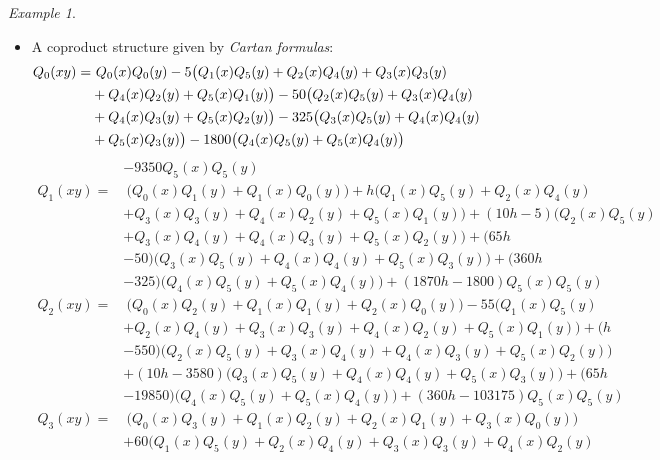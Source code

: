 \documentclass{gtpart}
\theoremstyle{definition}
\theoremstyle{remark}
\newtheorem{ex}[equation]{Example}
\renewcommand{\=}{\approx}
\renewcommand{\-}{\sim}
\numberwithin{equation}{section}
\begin{document}
\begin{ex}
\begin{itemize}
  \item A coproduct structure given by {\em Cartan formulas}: 
  \begin{equation*}
   \begin{split}
    Q_0(x y) = & ~ Q_0(x) Q_0(y) - 5 \big( Q_1(x) Q_5(y) + Q_2(x) Q_4(y) + Q_3(x) Q_3(y) \hskip 1.9cm \\
               & + Q_4(x) Q_2(y) + Q_5(x) Q_1(y) \big) - 50 \big( Q_2(x) Q_5(y) + Q_3(x) Q_4(y) \\
               & + Q_4(x) Q_3(y) + Q_5(x) Q_2(y) \big) - 325 \big( Q_3(x) Q_5(y) + Q_4(x) Q_4(y) \\
               & + Q_5(x) Q_3(y) \big) - 1800 \big( Q_4(x) Q_5(y) + Q_5(x) Q_4(y) \big) 
   \end{split}
  \end{equation*}
  \begin{equation*}
   \begin{split}
               & - 9350 Q_5(x) Q_5(y) \\
    Q_1(x y) = & ~ \big( Q_0(x) Q_1(y) + Q_1(x) Q_0(y) \big) + h \big( Q_1(x) Q_5(y) + Q_2(x) Q_4(y) \\
               & + Q_3(x) Q_3(y) + Q_4(x) Q_2(y) + Q_5(x) Q_1(y) \big) + (10 h - 5) \big( Q_2(x) Q_5(y) \\
               & + Q_3(x) Q_4(y) + Q_4(x) Q_3(y) + Q_5(x) Q_2(y) \big) + (65 h \\
               & - 50) \big( Q_3(x) Q_5(y) + Q_4(x) Q_4(y) + Q_5(x) Q_3(y) \big) + (360 h \\
               & - 325) \big( Q_4(x) Q_5(y) + Q_5(x) Q_4(y) \big) + (1870 h - 1800) Q_5(x) Q_5(y) \\
    Q_2(x y) = & ~ \big( Q_0(x) Q_2(y) + Q_1(x) Q_1(y) + Q_2(x) Q_0(y) \big) - 55 \big( Q_1(x) Q_5(y) \\
               & + Q_2(x) Q_4(y) + Q_3(x) Q_3(y) + Q_4(x) Q_2(y) + Q_5(x) Q_1(y) \big) + (h \\
               & - 550) \big( Q_2(x) Q_5(y) + Q_3(x) Q_4(y) + Q_4(x) Q_3(y) + Q_5(x) Q_2(y) \big) \\
               & + (10 h - 3580) \big( Q_3(x) Q_5(y) + Q_4(x) Q_4(y) + Q_5(x) Q_3(y) \big) + (65 h \\
               & - 19850) \big( Q_4(x) Q_5(y) + Q_5(x) Q_4(y) \big) + (360 h - 103175) Q_5(x) Q_5(y) \\
    Q_3(x y) = & ~ \big( Q_0(x) Q_3(y) + Q_1(x) Q_2(y) + Q_2(x) Q_1(y) + Q_3(x) Q_0(y) \big) \\
               & + 60 \big( Q_1(x) Q_5(y) + Q_2(x) Q_4(y) + Q_3(x) Q_3(y) + Q_4(x) Q_2(y) \\

\end{split}
\end{equation*}
\end{itemize}
\end{ex}
\end{document}

